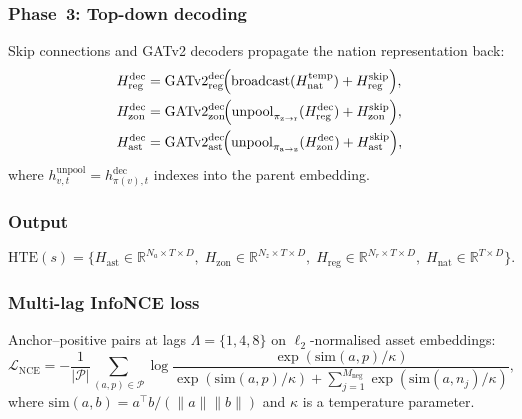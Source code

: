 \documentclass{article}
\begin{document}
\subsubsection*{Phase~3: Top-down decoding}

Skip connections and GATv2 decoders propagate the nation representation back:
\begin{align}
H^{\mathrm{dec}}_{\mathrm{reg}} &= \mathrm{GATv2}_{\mathrm{reg}}^{\mathrm{dec}}\!\Bigl(\mathrm{broadcast}(H^{\mathrm{temp}}_{\mathrm{nat}}) + H^{\mathrm{skip}}_{\mathrm{reg}}\Bigr), \label{eq:topdown_reg} \\
H^{\mathrm{dec}}_{\mathrm{zon}} &= \mathrm{GATv2}_{\mathrm{zon}}^{\mathrm{dec}}\!\Bigl(\mathrm{unpool}_{\pi_{\mathrm{z \to r}}}(H^{\mathrm{dec}}_{\mathrm{reg}}) + H^{\mathrm{skip}}_{\mathrm{zon}}\Bigr), \label{eq:topdown_zon} \\
H^{\mathrm{dec}}_{\mathrm{ast}} &= \mathrm{GATv2}_{\mathrm{ast}}^{\mathrm{dec}}\!\Bigl(\mathrm{unpool}_{\pi_{\mathrm{a \to z}}}(H^{\mathrm{dec}}_{\mathrm{zon}}) + H^{\mathrm{skip}}_{\mathrm{ast}}\Bigr), \label{eq:topdown_ast}
\end{align}
where $h^{\mathrm{unpool}}_{v,t} = h^{\mathrm{dec}}_{\pi(v),t}$ indexes into the parent embedding.

\subsubsection*{Output}

\begin{equation}
\mathrm{HTE}(s) = \bigl\{
  H_{\mathrm{ast}} \!\in\! \mathbb{R}^{N_a \times T \times D},\;
  H_{\mathrm{zon}} \!\in\! \mathbb{R}^{N_z \times T \times D},\;
  H_{\mathrm{reg}} \!\in\! \mathbb{R}^{N_r \times T \times D},\;
  H_{\mathrm{nat}} \!\in\! \mathbb{R}^{T \times D}
\bigr\}.
\label{eq:hte_output}
\end{equation}

\subsubsection*{Multi-lag InfoNCE loss}

Anchor--positive pairs at lags $\Lambda = \{1, 4, 8\}$ on $\ell_2$-normalised asset embeddings:
\begin{equation}
\mathcal{L}_{\mathrm{NCE}} = -\frac{1}{|\mathcal{P}|} \sum_{(a,p) \in \mathcal{P}} \log \frac{\exp(\mathrm{sim}(a, p) / \kappa)}{\exp(\mathrm{sim}(a, p) / \kappa) + \sum_{j=1}^{M_{\mathrm{neg}}} \exp(\mathrm{sim}(a, n_j) / \kappa)},
\label{eq:infonce}
\end{equation}
where $\mathrm{sim}(a, b) = a^\top b / (\|a\|\|b\|)$ and $\kappa$ is a temperature parameter.
\end{document}
